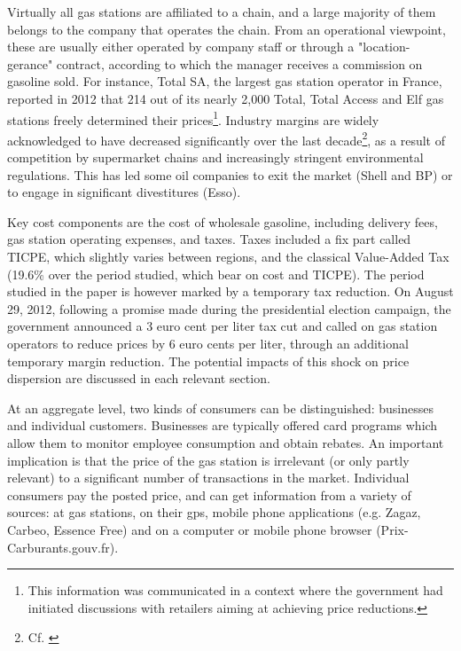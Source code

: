 \documentclass[english]{article}
\begin{document}
Virtually all gas stations are affiliated to a chain, and a large majority of them belongs to the company that operates the chain. From an operational viewpoint, these are usually  either operated by company staff or through a "location-gerance" contract, according to which the manager receives a commission on gasoline sold. For instance, Total SA, the largest gas station operator in France, reported in 2012 that 214 out of its nearly 2,000 Total, Total Access and Elf gas stations freely determined their prices\footnote{This information was communicated in a context where the government had initiated discussions with retailers aiming at achieving price reductions.}. Industry margins are widely acknowledged to have decreased significantly over the last decade\footnote{Cf. \cite{BEL12}}, as a result of competition by supermarket chains and increasingly stringent environmental regulations. This has led some oil companies to exit the market (Shell and BP) or to engage in significant divestitures (Esso).

Key cost components are the cost of wholesale gasoline, including delivery fees,  gas station operating expenses, and taxes. Taxes included a fix part called TICPE, which slightly varies between regions, and the classical Value-Added Tax (19.6\% over the period studied, which bear on cost and TICPE). The period studied in the paper is however marked by a temporary tax reduction. On August 29, 2012, following a promise made during the presidential election campaign, the government announced a 3 euro cent per liter tax cut and called on gas station operators to reduce prices by 6 euro cents per liter, through an additional temporary margin reduction. The potential impacts of this shock on price dispersion are discussed in each relevant section.

At an aggregate level, two kinds of consumers can be distinguished: businesses and individual customers. Businesses are typically offered card programs which allow them to monitor employee consumption and obtain rebates. An important implication is that the price of the gas station is irrelevant (or only partly relevant) to a significant number of transactions in the market. Individual consumers pay the posted price, and can get information from a variety of sources: at gas stations, on their gps, mobile phone applications (e.g. Zagaz, Carbeo, Essence Free) and on a computer or mobile phone browser (Prix-Carburants.gouv.fr).
\end{document}
